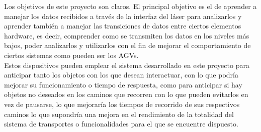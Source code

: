 
Los objetivos de este proyecto son claros. El principal objetivo es el de aprender a manejar los datos recibidos a través de la interfaz del láser para analizarlos y aprender también a manejar las transiciones de datos entre ciertos elementos hardware, es decir, comprender como se transmiten los datos en los niveles más bajos, poder analizarlos y utilizarlos con el fin de mejorar el comportamiento de ciertos sistemas como pueden ser los AGVs.\\

Estos dispositivos pueden emplear el sistema desarrollado en este proyecto para anticipar tanto los objetos con los que desean interactuar, con lo que podría mejorar su funcionamiento o tiempo de respuesta, como para anticipar si hay objetos no deseados en los caminos que recorren con lo que pueden evitarlos en vez de pausarse, lo que mejoraría los tiempos de recorrido de sus respectivos caminos lo que supondría una mejora en el rendimiento de la totalidad del sistema de transportes o funcionalidades para el que se encuentre dispuesto.